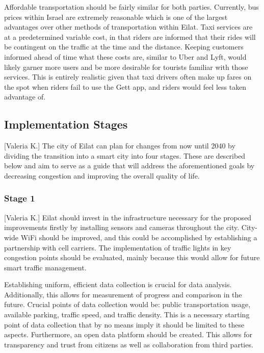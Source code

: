 \documentclass[12pt]{article}                       %
\begin{document}
Affordable transportation should be fairly similar for both parties. Currently, bus prices within Israel are extremely reasonable which is one of the largest advantages over other methods of transportation within Eilat. Taxi services are at a predetermined variable cost, in that riders are informed that their rides will be contingent on the traffic at the time and the distance. Keeping customers informed ahead of time what these costs are, similar to Uber and Lyft, would likely garner more users and be more desirable for tourists familiar with those services. This is entirely realistic given that taxi drivers often make up fares on the spot when riders fail to use the Gett app, and riders would feel less taken advantage of.

\subsection{Implementation Stages}[Valeria K.]
The city of Eilat can plan for changes from now until 2040 by dividing the transition into a smart city into four stages. These are described below and aim to serve as a guide that will address the aforementioned goals by decreasing congestion and improving the overall quality of life. 


\subsubsection{Stage 1}[Valeria K.]
Eilat should invest in the infrastructure necessary for the proposed improvements firstly by installing sensors and cameras throughout the city. City-wide WiFi should be improved, and this could be accomplished by establishing a partnership with cell carriers. The implementation of traffic lights in key congestion points should be evaluated, mainly because this would allow for future smart traffic management. 

Establishing uniform, efficient data collection is crucial for data analysis. Additionally, this allows for measurement of progress and comparison in the future. Crucial points of data collection would be: public transportation usage, available parking, traffic speed, and traffic density. This is a necessary starting point of data collection that by no means imply it should be limited to these aspects. Furthermore, an open data platform should be created. This allows for transparency and trust from citizens as well as collaboration from third parties. 
\end{document}
